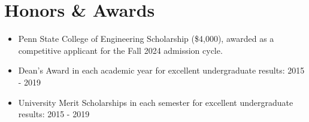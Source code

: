 \section{Honors \& Awards}
\begin{itemize}
    \item Penn State College of Engineering Scholarship (\$4{,}000), awarded as a competitive applicant for the Fall 2024 admission cycle.
    \item Dean's Award in each academic year for excellent undergraduate results: 2015 - 2019
    \item University Merit Scholarships in each semester for excellent undergraduate results: 2015 - 2019
\end{itemize}

\endinput